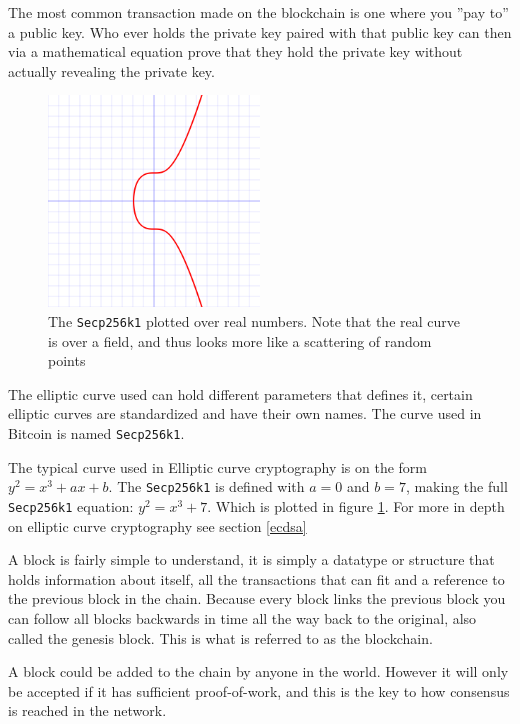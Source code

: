 The most common transaction made on the blockchain is one where you ''pay to''
a public key. Who ever holds the private key paired with that public key can
then via a mathematical equation prove that they hold the private key without
actually revealing the private key.\cite{quantabytes}

\begin{figure}[H]
	\centering
	\includegraphics[width=0.5\textwidth]{introduction/images/Secp256k1.png}
	\caption{The \texttt{Secp256k1} plotted over real numbers. Note that the real
	curve is over a field, and thus looks more like a scattering of random points}
	\label{fig:eccbasic}
\end{figure}

The elliptic curve used can hold different parameters that defines it, certain
elliptic curves are standardized and have their own names. The curve used in
Bitcoin is named \texttt{Secp256k1}.\cite{Secp256k1_def}\cite{antonopoulos_2017}

The typical curve used in Elliptic curve cryptography is on the form
$y^2=x^3+ax+b$. The \texttt{Secp256k1} is defined with $a=0$ and $b=7$, making
the full \texttt{Secp256k1} equation: $y^2=x^3+7$. Which is plotted in figure
\ref*{fig:eccbasic}. For more in depth on elliptic curve cryptography see
section \ref{ecdsa}

A block is fairly simple to understand, it is simply a datatype or structure
that holds information about itself, all the transactions that can fit and a
reference to the previous block in the chain. Because every block links the previous
block you can follow all blocks backwards in time
all the way back to the original, also called the genesis block.\cite{genesis}
This is what is referred to as the blockchain.

A block could be added to the chain by anyone in the world. However it will only
be accepted if it has sufficient proof-of-work, and this is the key to how
consensus is reached in the network.\cite{antonopoulos_2017}

